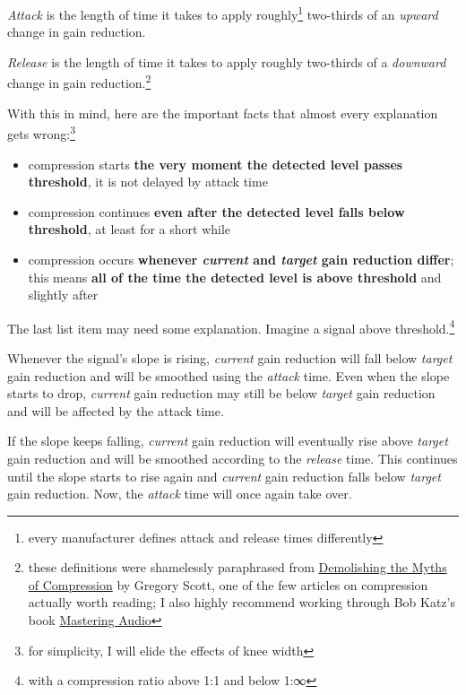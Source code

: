 \emph{Attack} is the length of time it takes to apply
roughly\footnote{every manufacturer defines attack and release times
  differently} two-thirds of an \emph{upward} change in gain
reduction.

\emph{Release} is the length of time it takes to apply roughly
two-thirds of a \emph{downward} change in gain
reduction.\footnote{these definitions were shamelessly paraphrased
  from
  \href{https://www.attackmagazine.com/features/columns/gregory-scott-demolishing-the-myths-of-compression/}{Demolishing
    the Myths of Compression} by Gregory Scott, one of the few
  articles on compression actually worth reading; I also highly
  recommend working through Bob Katz's book
  \href{https://www.soundonsound.com/reviews/bob-katz-mastering-audio}{Mastering
    Audio}}

With this in mind, here are the important facts that almost every
explanation gets wrong:\footnote{for simplicity, I will elide the
  effects of knee width}

\begin{itemize}
\item compression starts \textbf{the very moment the detected level
    passes threshold}, it is not delayed by attack time
\item compression continues \textbf{even after the detected level
    falls below threshold}, at least for a short while
\item compression occurs \textbf{whenever \emph{current} and
    \emph{target} gain reduction differ}; this means \textbf{all of
    the time the detected level is above threshold} and slightly after
\end{itemize}

The last list item may need some explanation.  Imagine a signal above
threshold.\footnote{with a compression ratio above 1:1 and below 1:∞}

Whenever the signal's slope is rising, \emph{current} gain reduction
will fall below \emph{target} gain reduction and will be smoothed
using the \emph{attack} time.  Even when the slope starts to drop,
\emph{current} gain reduction may still be below \emph{target} gain
reduction and will be affected by the attack time.

If the slope keeps falling, \emph{current} gain reduction will
eventually rise above \emph{target} gain reduction and will be
smoothed according to the \emph{release} time.  This continues until
the slope starts to rise again and \emph{current} gain reduction falls
below \emph{target} gain reduction.  Now, the \emph{attack} time will
once again take over.

